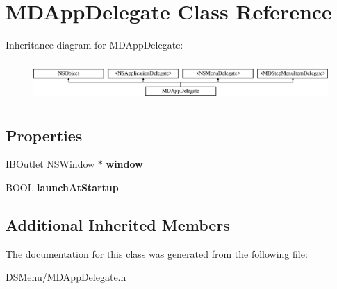 \hypertarget{interface_m_d_app_delegate}{\section{M\-D\-App\-Delegate Class Reference}
\label{interface_m_d_app_delegate}
}
Inheritance diagram for M\-D\-App\-Delegate\-:\begin{figure}[H]
\begin{center}
\leavevmode
\includegraphics[height=1.530055cm]{interface_m_d_app_delegate}
\end{center}
\end{figure}
\subsection*{Properties}
\begin{DoxyCompactItemize}
\item 
\hypertarget{interface_m_d_app_delegate_a0758151aaf56aadb705303b2715081c8}{I\-B\-Outlet N\-S\-Window $\ast$ {\bfseries window}}\label{interface_m_d_app_delegate_a0758151aaf56aadb705303b2715081c8}

\item 
\hypertarget{interface_m_d_app_delegate_a3344f6b269fb5ffe6c46ef57024f946c}{B\-O\-O\-L {\bfseries launch\-At\-Startup}}\label{interface_m_d_app_delegate_a3344f6b269fb5ffe6c46ef57024f946c}

\end{DoxyCompactItemize}
\subsection*{Additional Inherited Members}


The documentation for this class was generated from the following file\-:\begin{DoxyCompactItemize}
\item 
D\-S\-Menu/M\-D\-App\-Delegate.\-h\end{DoxyCompactItemize}
